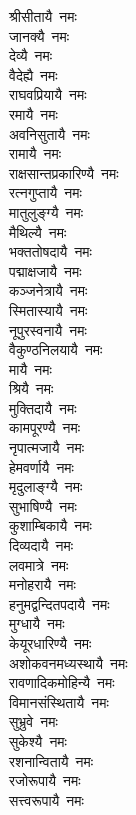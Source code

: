 \begin{multicols}{2}
\begin{flushleft}
श्रीसीतायै~नमः\\
जानक्यै~नमः\\
देव्यै~नमः\\
वैदेह्यै~नमः\\
राघवप्रियायै~नमः\\
रमायै~नमः\\
अवनिसुतायै~नमः\\
रामायै~नमः\\
राक्षसान्तप्रकारिण्यै~नमः\\
रत्नगुप्तायै~नमः\hfill{}\\
मातुलुङ्ग्यै~नमः\\
मैथिल्यै~नमः\\
भक्ततोषदायै~नमः\\
पद्माक्षजायै~नमः\\
कञ्जनेत्रायै~नमः\\
स्मितास्यायै~नमः\\
नूपुरस्वनायै~नमः\\
वैकुण्ठनिलयायै~नमः\\
मायै~नमः\\
श्रियै~नमः\hfill{}\\
मुक्तिदायै~नमः\\
कामपूरण्यै~नमः\\
नृपात्मजायै~नमः\\
हेमवर्णायै~नमः\\
मृदुलाङ्ग्यै~नमः\\
सुभाषिण्यै~नमः\\
कुशाम्बिकायै~नमः\\
दिव्यदायै~नमः\\
लवमात्रे~नमः\\
मनोहरायै~नमः\hfill{}\\
हनुमद्वन्दितपदायै~नमः\\
मुग्धायै~नमः\\
केयूरधारिण्यै~नमः\\
अशोकवनमध्यस्थायै~नमः\\
रावणादिकमोहिन्यै~नमः\\
विमानसंस्थितायै~नमः\\
सुभ्रुवे~नमः\\
सुकेश्यै~नमः\\
रशनान्वितायै~नमः\\
रजोरूपायै~नमः\hfill{}\\
सत्त्वरूपायै~नमः\\

\end{flushleft}
\end{multicols}
